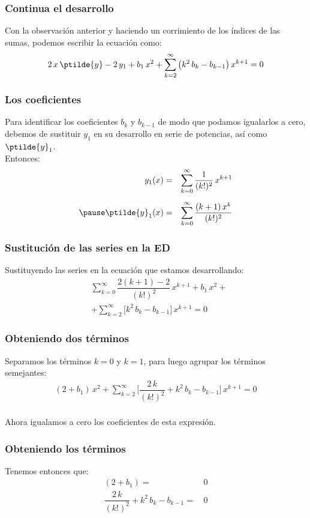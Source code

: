 \begin{frame}
\frametitle{Continua el desarrollo}
Con la observación anterior y haciendo un corrimiento de los índices de las sumas, podemos escribir la ecuación como:
\begin{align*}
2 \, x \, \ptilde{y} -  2 \, y_{1} + b_{1} \, x^{2} +  \sum_{k=2}^{\infty} \big( k^{2} \, b_{k} - b_{k-1} \big) \, x^{k+1} = 0
\end{align*}
\end{frame}
\begin{frame}
\frametitle{Los coeficientes}
Para identificar los coeficientes $b_{k}$ y $b_{k-1}$ de modo que podamos igualarlos a cero, debemos de sustituir $y_{1}$ en su desarrollo en serie de potencias, así como $\ptilde{y}_{1}$.
\\
\bigskip
\pause
Entonces:
\begin{eqnarray*}
y_{1}(x) &=& \sum_{k=0}^{\infty} \dfrac{1}{(k!)^{2}} \, x^{k+1}\\[0.5em] \pause
\ptilde{y}_{1} (x) &=& \sum_{k=0}^{\infty} \dfrac{(k+1) \, x^{k}}{(k!)^{2}}
\end{eqnarray*}
\end{frame}
\begin{frame}
\frametitle{Sustitución de las series en la ED}
Sustituyendo las series en la ecuación que estamos desarrollando:
\begin{align*}
&\sum_{k=0}^{\infty} \dfrac{2(k + 1) - 2}{(k!)^{2}} \, x^{k+1} + b_{1} \, x^{2} + \\[0.5em]
&+ \sum_{k=2}^{\infty} \bigg[ k^{2} \, b_{k} - b_{k-1} \bigg] \, x^{k+1} = 0
\end{align*}
\end{frame}
\begin{frame}
\frametitle{Obteniendo dos términos}
Separamos los términos $k = 0$ y $k = 1$, para luego agrupar los términos semejantes:
\begin{align*}
(2 + b_{1}) \, x^{2} + \sum_{k=2}^{\infty} \bigg[ \dfrac{2 \, k}{(k!)^2} + k^{2} \, b_{k} - b_{k-1} \bigg] \, x^{k+1} = 0
\end{align*}
\\
\bigskip
\pause
Ahora igualamos a cero los coeficientes de esta expresión.
\end{frame}
\begin{frame}
\frametitle{Obteniendo los términos}
Tenemos entonces que:
\begin{align*}
(2 + b_{1}) =& \, 0 \\[1em]
\dfrac{2 \, k}{(k!)^2} + k^{2} \, b_{k} - b_{k-1} =& \, 0
\end{align*}
\end{frame}
